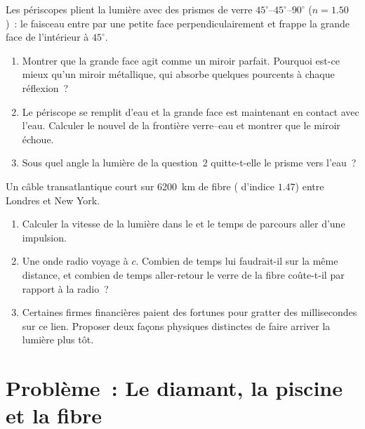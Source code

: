 \begin{exercise}[$\star\star\star$]\label{exo:g10:refraction:14}
Les périscopes plient la lumière avec des prismes de verre
$45^\circ$--$45^\circ$--$90^\circ$ ($n = 1.50$)~: le faisceau entre par
une petite face perpendiculairement et frappe la grande face de
l'intérieur à $45^\circ$.
\begin{enumerate}
  \item Montrer que la grande face agit comme un miroir parfait.
        Pourquoi est-ce mieux qu'un miroir métallique, qui absorbe
        quelques pourcents à chaque réflexion~?
  \item Le périscope se remplit d'eau et la grande face est maintenant
        en contact avec l'eau. Calculer le nouvel 
        de la frontière verre--eau et montrer que le miroir échoue.
  \item Sous quel angle la lumière de la question~2 quitte-t-elle le
        prisme vers l'eau~?
\end{enumerate}
\end{exercise}

\begin{exercise}[$\star\star\star$]\label{exo:g10:refraction:15}
Un câble transatlantique court sur \qty{6200}{km} de fibre (
d'indice $1.47$) entre Londres et New York.
\begin{enumerate}
  \item Calculer la vitesse de la lumière dans le  et le temps
        de parcours aller d'une impulsion.
  \item Une onde radio voyage à $c$. Combien de temps lui faudrait-il
        sur la même distance, et combien de temps aller-retour le verre
        de la fibre coûte-t-il par rapport à la radio~?
  \item Certaines firmes financières paient des fortunes pour gratter
        des millisecondes sur ce lien. Proposer deux façons physiques
        distinctes de faire arriver la lumière plus tôt.
\end{enumerate}
\end{exercise}

\section{Problème~: Le diamant, la piscine et la fibre}

